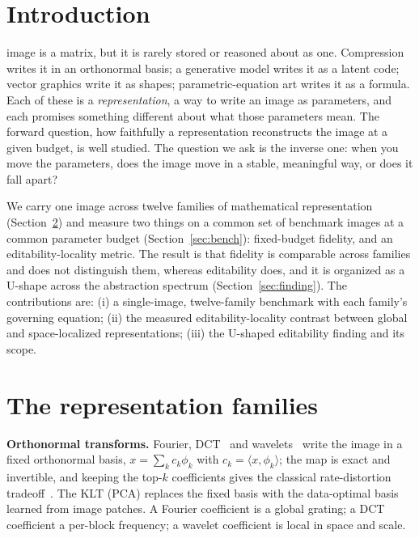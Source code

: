 \documentclass[journal]{IEEEtran}
\begin{document}
\maketitle
\IEEEdisplaynotcompsoctitleabstractindextext
\IEEEpeerreviewmaketitle

\section{Introduction}

 image is a matrix, but it is rarely stored or reasoned about as one. Compression
writes it in an orthonormal basis; a generative model writes it as a latent code; vector graphics
write it as shapes; parametric-equation art writes it as a formula. Each of these is a
\emph{representation}, a way to write an image as parameters, and each promises something different
about what those parameters mean. The forward question, how faithfully a representation reconstructs
the image at a given budget, is well studied. The question we ask is the inverse one: when you move
the parameters, does the image move in a stable, meaningful way, or does it fall apart?

We carry one image across twelve families of mathematical representation (Section~\ref{sec:families})
and measure two things on a common set of benchmark images at a common parameter budget
(Section~\ref{sec:bench}): fixed-budget fidelity, and an editability-locality metric. The result is
that fidelity is comparable across families and does not distinguish them, whereas editability does,
and it is organized as a U-shape across the abstraction spectrum (Section~\ref{sec:finding}). The
contributions are: (i) a single-image, twelve-family benchmark with each family's governing equation;
(ii) the measured editability-locality contrast between global and space-localized representations;
(iii) the U-shaped editability finding and its scope.

\section{The representation families}
\label{sec:families}

\textbf{Orthonormal transforms.} Fourier, DCT~\cite{ahmed1974} and wavelets~\cite{mallat1989} write
the image in a fixed orthonormal basis, $x=\sum_k c_k\phi_k$ with $c_k=\langle x,\phi_k\rangle$; the
map is exact and invertible, and keeping the top-$k$ coefficients gives the classical rate-distortion
tradeoff~\cite{wallace1992}. The KLT (PCA) replaces the fixed basis with the data-optimal basis
learned from image patches. A Fourier coefficient is a global grating; a DCT coefficient a per-block
frequency; a wavelet coefficient is local in space and scale.
\end{document}
